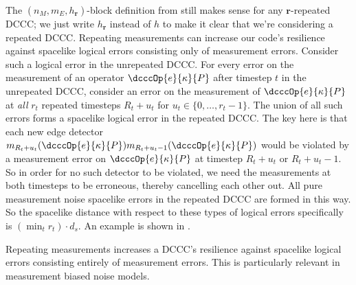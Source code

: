 The $(n_M, m_E, h_\mathbf{r})$-block definition from  still makes sense for any $\mathbf{r}$-repeated DCCC;
we just write $h_{\mathbf{r}}$ instead of $h$ to make it clear that we're considering a repeated DCCC.
Repeating measurements can increase our code's resilience against spacelike logical errors consisting only of measurement errors.
Consider such a logical error in the unrepeated DCCC.
For every error on the measurement of an operator $\dcccOp{e}{\kappa}{P}$ after timestep $t$ in the unrepeated DCCC,
consider an error on the measurement of $\dcccOp{e}{\kappa}{P}$ at \emph{all} $r_t$ repeated timesteps $R_t + u_t$ for $u_t \in \{0, \ldots, r_t - 1\}$.
The union of all such errors forms a spacelike logical error in the repeated DCCC.
The key here is that each new edge detector
$m_{R_t + u_t}(\dcccOp{e}{\kappa}{P}) m_{R_t + u_t - 1}(\dcccOp{e}{\kappa}{P})$
would be violated by a measurement error on $\dcccOp{e}{\kappa}{P}$ at timestep $R_t + u_t$ or $R_t + u_t - 1$.
So in order for no such detector to be violated, we need the measurements at both timesteps to be erroneous, thereby cancelling each other out.
All pure measurement noise spacelike errors in the repeated DCCC are formed in this way.
So the spacelike distance with respect to these types of logical errors specifically is $(\min_{t} r_t) \cdot d_s$.
An example is shown in .

\begin{difference}\label{dif:repeated_spacelike_logicals}
Repeating measurements increases a DCCC's resilience against spacelike logical errors consisting entirely of measurement errors.
This is particularly relevant in measurement biased noise models.
\end{difference}

